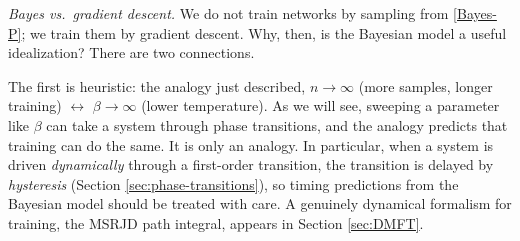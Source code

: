 \documentclass[11pt]{article}
\begin{document}
\emph{Bayes vs.\ gradient descent.} We do not train networks by sampling from \eqref{Bayes-P}; we train them by gradient descent. Why, then, is the Bayesian model a useful idealization? There are two connections.

The first is heuristic: the analogy just described, $n\to\infty$ (more samples, longer training) $\leftrightarrow$ $\beta\to\infty$ (lower temperature). As we will see, sweeping a parameter like $\beta$ can take a system through phase transitions, and the analogy predicts that training can do the same. It is only an analogy. In particular, when a system is driven \emph{dynamically} through a first-order transition, the transition is delayed by \emph{hysteresis} (Section \ref{sec:phase-transitions}), so timing predictions from the Bayesian model should be treated with care. A genuinely dynamical formalism for training, the MSRJD path integral, appears in Section \ref{sec:DMFT}.
\end{document}
